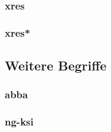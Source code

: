 \subsubsection{\gls{xres}}

\subsubsection{\gls{xres*}}




\subsection{Weitere Begriffe}

\subsubsection{\gls{abba}}

\subsubsection{\gls{ng-ksi}}
















